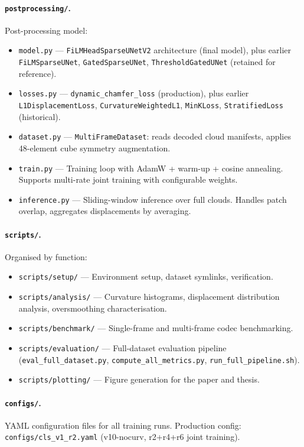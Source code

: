 \paragraph{\texttt{postprocessing/}.}
Post-processing model:
\begin{itemize}
  \item \texttt{model.py} --- \texttt{FiLMHeadSparseUNetV2} architecture
    (final model), plus earlier \texttt{FiLMSparseUNet}, \texttt{GatedSparseUNet},
    \texttt{ThresholdGatedUNet} (retained for reference).
  \item \texttt{losses.py} --- \texttt{dynamic\_chamfer\_loss} (production),
    plus earlier \texttt{L1DisplacementLoss}, \texttt{CurvatureWeightedL1},
    \texttt{MinKLoss}, \texttt{StratifiedLoss} (historical).
  \item \texttt{dataset.py} --- \texttt{MultiFrameDataset}: reads decoded cloud
    manifests, applies 48-element cube symmetry augmentation.
  \item \texttt{train.py} --- Training loop with AdamW + warm-up + cosine
    annealing. Supports multi-rate joint training with configurable weights.
  \item \texttt{inference.py} --- Sliding-window inference over full clouds.
    Handles patch overlap, aggregates displacements by averaging.
\end{itemize}

\paragraph{\texttt{scripts/}.}
Organised by function:
\begin{itemize}
  \item \texttt{scripts/setup/} --- Environment setup, dataset symlinks,
    verification.
  \item \texttt{scripts/analysis/} --- Curvature histograms, displacement
    distribution analysis, oversmoothing characterisation.
  \item \texttt{scripts/benchmark/} --- Single-frame and multi-frame codec
    benchmarking.
  \item \texttt{scripts/evaluation/} --- Full-dataset evaluation pipeline
    (\texttt{eval\_full\_dataset.py}, \texttt{compute\_all\_metrics.py},
    \texttt{run\_full\_pipeline.sh}).
  \item \texttt{scripts/plotting/} --- Figure generation for the paper and thesis.
\end{itemize}

\paragraph{\texttt{configs/}.}
YAML configuration files for all training runs. Production config:
\texttt{configs/cls\_v1\_r2.yaml} (v10-nocurv, r2+r4+r6 joint training).

